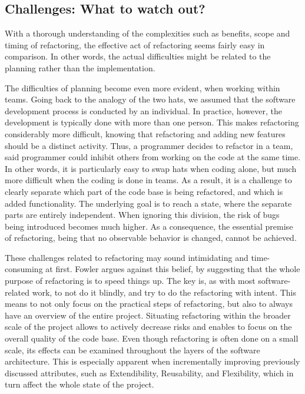 
\subsection{Challenges: What to watch out?}

With a thorough understanding of the complexities 
	such as benefits, scope and timing of refactoring, 
	the effective act of refactoring seems fairly easy in comparison. 
In other words, 
	the actual difficulties
	might be related to the planning rather than the implementation. 

The difficulties of planning become even more evident,
	when working within teams.
Going back to the analogy of the two hats, 
	we assumed that the software development process 
	is conducted by an individual. 
In practice, however, 
	the development is typically done with more than one person. 
 This makes refactoring considerably more difficult,
 	knowing that refactoring and adding new features 
	should be a distinct activity. 
Thus, a programmer decides to refactor in a team,
	said programmer could inhibit others from working on the code 
	at the same time. 
In other words, it is particularly easy to swap hats when coding alone, 
	but much more difficult when the coding is done in teams. 
As a result, 
	it is a challenge to clearly separate 
	which part of the code base is being refactored, 
	and which is added functionality. 
The underlying goal is to reach a state,
	where the separate parts are entirely independent. 
When ignoring this division, 
	the risk of bugs being introduced becomes much higher. 
As a consequence, 
	the essential premise of refactoring, 
	being that no observable behavior is changed, 
	cannot be achieved.

These challenges related to refactoring 
	may sound intimidating and time-consuming at first.
Fowler \textcite[p.~56]{fowler2018} argues against this belief,
	by suggesting that the whole purpose of refactoring 
	is to speed things up.
The key is, as with most software-related work, to not do it blindly, 
	and try to do the refactoring with intent.
 This means to not only focus on the practical steps of refactoring,
 	but also to always have an overview of the entire project.
Situating refactoring within the broader scale of the project 
	allows to actively decrease risks and 
    enables to focus on the overall quality of the code base.
Even though refactoring is often done on a small scale,
	its effects can be examined 
	throughout the layers of the software architecture.
This is especially apparent when incrementally improving previously discussed attributes,
	such as Extendibility, Reusability, and Flexibility, 
	which in turn affect the whole state of the project. 

